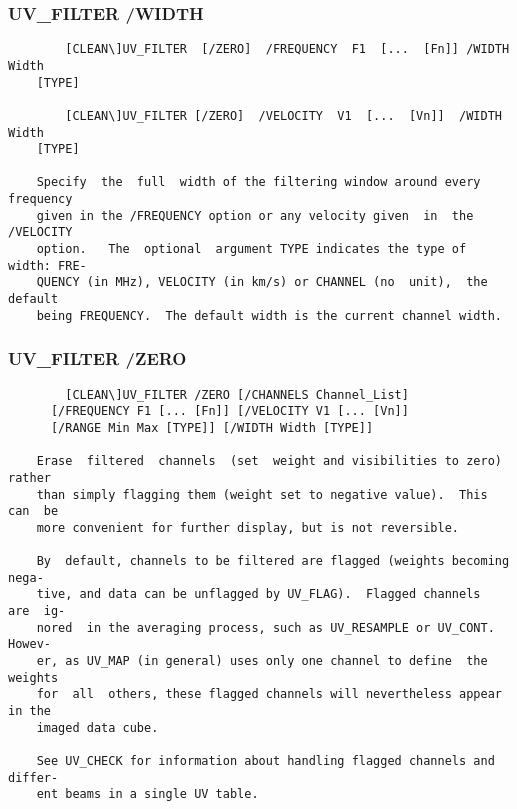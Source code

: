 \subsubsection{UV\_FILTER /WIDTH}
\begin{verbatim}
        [CLEAN\]UV_FILTER  [/ZERO]  /FREQUENCY  F1  [...  [Fn]] /WIDTH Width
    [TYPE]

        [CLEAN\]UV_FILTER [/ZERO]  /VELOCITY  V1  [...  [Vn]]  /WIDTH  Width
    [TYPE]

    Specify  the  full  width of the filtering window around every frequency
    given in the /FREQUENCY option or any velocity given  in  the  /VELOCITY
    option.   The  optional  argument TYPE indicates the type of width: FRE-
    QUENCY (in MHz), VELOCITY (in km/s) or CHANNEL (no  unit),  the  default
    being FREQUENCY.  The default width is the current channel width.

\end{verbatim}
\subsubsection{UV\_FILTER /ZERO}
\begin{verbatim}
        [CLEAN\]UV_FILTER /ZERO [/CHANNELS Channel_List]
      [/FREQUENCY F1 [... [Fn]] [/VELOCITY V1 [... [Vn]]
      [/RANGE Min Max [TYPE]] [/WIDTH Width [TYPE]]

    Erase  filtered  channels  (set  weight and visibilities to zero) rather
    than simply flagging them (weight set to negative value).  This  can  be
    more convenient for further display, but is not reversible.

    By  default, channels to be filtered are flagged (weights becoming nega-
    tive, and data can be unflagged by UV_FLAG).  Flagged channels  are  ig-
    nored  in the averaging process, such as UV_RESAMPLE or UV_CONT.  Howev-
    er, as UV_MAP (in general) uses only one channel to define  the  weights
    for  all  others, these flagged channels will nevertheless appear in the
    imaged data cube.

    See UV_CHECK for information about handling flagged channels and differ-
    ent beams in a single UV table.


\end{verbatim}
